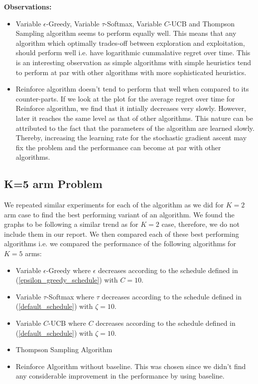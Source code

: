 \documentclass{article}
\begin{document}
		\textbf{Observations:}
		\begin{itemize}
			\item Variable $\epsilon$-Greedy, Variable $\tau$-Softmax, Variable $C$-UCB and Thompson Sampling algorithm seems to perform equally well. This means
				that any algorithm which optimally trades-off between exploration and exploitation, should perform well i.e. have logarithmic cummalative regret over 
				time. This is an interesting observation as simple algorithms with simple heuristics tend to perform at par with other algorithms with more 
				sophisticated heuristics.
			\item Reinforce algorithm doesn't tend to perform that well when compared to its counter-parts. If we look at the plot for the average regret over time
				for Reinforce algorithm, we find that it intially decreases very slowly. However, later it reaches the same level as that of other algorithms. This
				nature can be attributed to the fact that the parameters of the algorithm are learned slowly. Thereby, increasing the learning rate for the 
				stochastic gradient ascent may fix the problem and the performance can become at par with other algorithms.	
		\end{itemize}
		
	\subsection{K=5 arm Problem}
		\label{5_bernoulli_comparison}
		We repeated similar experiments for each of the algorithm as we did for $K=2$ arm case to find the best performing variant of an algorithm. We found the 
		graphs to be following a similar trend as for $K=2$ case, therefore, we do not include them in our report. We then compared each of these best performing
		algorithms i.e. we compared the performance of the following algorithms for $K=5$ arms:
		\begin{itemize}
			\item Variable $\epsilon$-Greedy where $\epsilon$ decreases according to the schedule defined in (\ref{epsilon_greedy_schedule}) with $C=10$.
			\item Variable $\tau$-Softmax where $\tau$ decreases according to the schedule defined in (\ref{default_schedule}) with $\zeta=10$.
			\item Variable $C$-UCB where $C$ decreases according to the schedule defined in (\ref{default_schedule}) with $\zeta=10$.
			\item Thompson Sampling Algorithm
			\item Reinforce Algorithm without baseline. This was chosen since we didn't find any considerable improvement in the performance by using baseline.
		\end{itemize}
		
\end{document}
